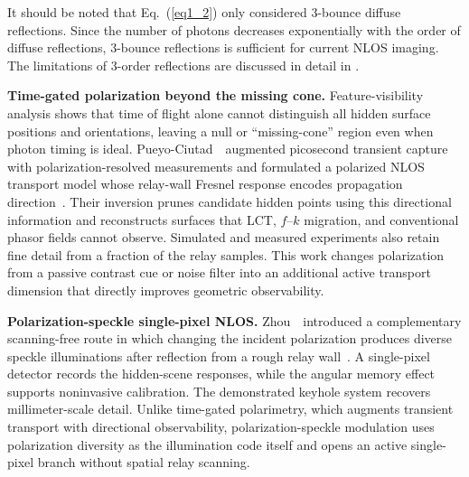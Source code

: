 It should be noted that Eq.~(\ref{eq1_2}) only considered 3-bounce diffuse reflections. Since the number of photons decreases exponentially with the order of diffuse reflections, 3-bounce reflections is sufficient for current NLOS imaging. The limitations of 3-order reflections are discussed in detail in \cite{liuAnalysisFeatureVisibility2019}.


\vspace{0.8mm}
\noindent \textbf{Time-gated polarization beyond the missing cone.}
Feature-visibility analysis shows that time of flight alone cannot distinguish all hidden surface positions and orientations, leaving a null or ``missing-cone'' region even when photon timing is ideal. Pueyo-Ciutad~\etal~augmented picosecond transient capture with polarization-resolved measurements and formulated a polarized NLOS transport model whose relay-wall Fresnel response encodes propagation direction~\cite{pueyoTimeGatedPolarization2024}. Their inversion prunes candidate hidden points using this directional information and reconstructs surfaces that LCT, $f$--$k$ migration, and conventional phasor fields cannot observe. Simulated and measured experiments also retain fine detail from a fraction of the relay samples. This work changes polarization from a passive contrast cue or noise filter into an additional active transport dimension that directly improves geometric observability.

\vspace{0.8mm}
\noindent \textbf{Polarization-speckle single-pixel NLOS.}
Zhou~\etal~introduced a complementary scanning-free route in which changing the incident polarization produces diverse speckle illuminations after reflection from a rough relay wall~\cite{zhouPolarizationSpeckleNLOS2026}. A single-pixel detector records the hidden-scene responses, while the angular memory effect supports noninvasive calibration. The demonstrated keyhole system recovers millimeter-scale detail. Unlike time-gated polarimetry, which augments transient transport with directional observability, polarization-speckle modulation uses polarization diversity as the illumination code itself and opens an active single-pixel branch without spatial relay scanning.


